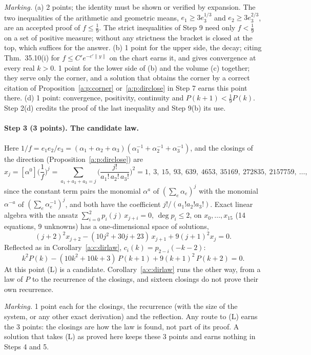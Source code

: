 \documentclass[11pt]{article}
\theoremstyle{plain}
\theoremstyle{definition}
\theoremstyle{remark}
\begin{document}
\smallskip\noindent\emph{Marking.} (a) 2 points; the identity must be shown or verified by expansion. The two inequalities of the arithmetic and geometric means, $e_1\ge3e_3^{1/3}$ and $e_2\ge3e_3^{2/3}$, are an accepted proof of $f\le\frac19$. The strict inequalities of Step 9 need only $f<\frac19$ on a set of positive measure; without any strictness the bracket is closed at the top, which suffices for the answer. (b) 1 point for the upper side, the decay; citing Thm.~35.10(i) for $f\le C'e^{-c'\|y\|}$ on the chart earns it, and gives convergence at every real $k>0$. 1 point for the lower side of (b) and the volume (c) together; they serve only the corner, and a solution that obtains the corner by a correct citation of Proposition~\ref{a:p:corner} or~\ref{a:p:dirclose} in Step 7 earns this point there. (d) 1 point: convergence, positivity, continuity and $P(k+1)<\frac19P(k)$. Step 2(d) credits the proof of the last inequality and Step 9(b) its use.

\paragraph{Step 3 (3 points). The candidate law.}
Here $1/f=e_1e_2/e_3=(\alpha_1+\alpha_2+\alpha_3)(\alpha_1^{-1}+\alpha_2^{-1}+\alpha_3^{-1})$, and the closings of the direction (Proposition~\ref{a:p:dirclose}) are
\[
x_j=[\alpha^0]\Big(\frac1f\Big)^j=\sum_{a_1+a_2+a_3=j}\Big(\frac{j!}{a_1!\,a_2!\,a_3!}\Big)^2=1,\ 3,\ 15,\ 93,\ 639,\ 4653,\ 35169,\ 272835,\ 2157759,\ \dots,
\]
since the constant term pairs the monomial $\alpha^a$ of $(\sum_e\alpha_e)^j$ with the monomial $\alpha^{-a}$ of $(\sum_e\alpha_e^{-1})^j$, and both have the coefficient $j!/(a_1!a_2!a_3!)$. Exact linear algebra with the ansatz $\sum_{i=0}^2p_i(j)\,x_{j+i}=0$, $\deg p_i\le2$, on $x_0,\dots,x_{15}$ (14 equations, 9 unknowns) has a one-dimensional space of solutions,
\[
(j+2)^2x_{j+2}-(10j^2+30j+23)\,x_{j+1}+9(j+1)^2x_j=0 .
\]
Reflected as in Corollary~\ref{a:c:dirlaw}, $c_i(k)=p_{2-i}(-k-2)$:
\begin{equation}\tag{L}
k^2P(k)-(10k^2+10k+3)\,P(k+1)+9(k+1)^2\,P(k+2)=0 .
\end{equation}
At this point (L) is a candidate. Corollary~\ref{a:c:dirlaw} runs the other way, from a law of $P$ to the recurrence of the closings, and sixteen closings do not prove their own recurrence.

\smallskip\noindent\emph{Marking.} 1 point each for the closings, the recurrence (with the size of the system, or any other exact derivation) and the reflection. Any route to (L) earns the 3 points: the closings are how the law is found, not part of its proof. A solution that takes (L) as proved here keeps these 3 points and earns nothing in Steps 4 and 5.
\end{document}
